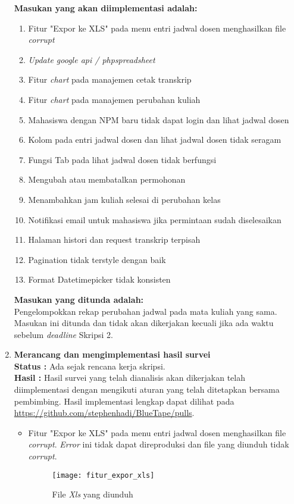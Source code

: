 \documentclass[a4paper,twoside]{article}
\begin{document}
\begin{enumerate}
	\textbf{Masukan yang akan diimplementasi adalah:}
	\begin{enumerate}
		\item Fitur "Expor ke XLS" pada menu  entri jadwal dosen  menghasilkan file \textit{corrupt}		
		\item \textit{Update google api / phpspreadsheet}		
		\item  Fitur \textit{chart} pada manajemen cetak transkrip		
		\item Fitur \textit{chart} pada manajemen perubahan kuliah		
		\item Mahasiswa dengan NPM baru tidak dapat login dan lihat jadwal dosen		
		\item Kolom pada entri jadwal dosen dan lihat jadwal dosen tidak seragam
		\item Fungsi Tab pada lihat jadwal dosen tidak berfungsi
		\item Mengubah atau membatalkan permohonan
		\item Menambahkan jam kuliah selesai di perubahan kelas
		\item Notifikasi email untuk mahasiswa jika permintaan sudah diselesaikan
		\item Halaman histori dan request transkrip terpisah
		\item Pagination tidak terstyle dengan baik
		\item Format Datetimepicker tidak konsisten
	\end{enumerate}

	\textbf{Masukan yang ditunda adalah:} \\
	Pengelompokkan rekap perubahan jadwal pada mata kuliah yang sama. \\
	 Masukan ini ditunda dan tidak akan dikerjakan kecuali jika ada waktu sebelum \textit{deadline} Skripsi 2.

	\item \textbf{Merancang dan mengimplementasi hasil survei}\\
	{\bf Status :} Ada sejak rencana kerja skripsi.\\
	{\bf Hasil :} Hasil survei yang telah dianalisis akan dikerjakan telah diimplementasi dengan mengikuti aturan yang telah ditetapkan bersama pembimbing. Hasil implementasi lengkap dapat dilihat pada \url{https://github.com/stephenhadi/BlueTape/pulls}.	
	
	\begin{itemize}
		\item Fitur "Expor ke XLS" pada menu  entri jadwal dosen  menghasilkan file \textit{corrupt}. \textit{Error} ini tidak dapat direproduksi dan file yang diunduh tidak \textit{corrupt}.		
		\begin{figure}[H]
			\centering
			\texttt{[image: fitur\_expor\_xls]} 
			\caption{File \textit{Xls} yang diunduh}
			\label{fig:expor_ke_xls} 
		\end{figure}
		

\end{itemize}
\end{enumerate}
\end{document}
